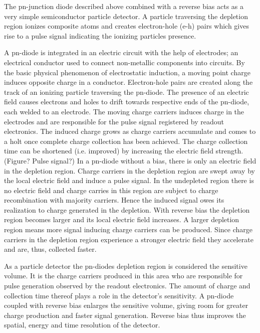 The pn-junction diode described above combined with a reverse bias acts as a very simple semiconductor particle detector. A particle traversing the depletion region ionizes composite atoms and creates electron-hole (e-h) pairs which gives rise to a pulse signal indicating the ionizing particles presence.

A pn-diode is integrated in an electric circuit with the help of electrodes; an electrical conductor used to connect non-metallic components into circuits. By the basic physical phenomenon of electrostatic induction, a moving point charge induces opposite charge in a conductor. Electron-hole pairs are created along the track of an ionizing particle traversing the pn-diode. The presence of an electric field causes electrons and holes to drift towards respective ends of the pn-diode, each welded to an electrode. The moving charge carriers induces charge in the electrodes and are responsible for the pulse signal registered by readout electronics. The induced charge grows as charge carriers accumulate and comes to a holt once complete charge collection has been achieved. The charge collection time can be shortened (i.e. improved) by increasing the electric field strength.  (Figure? Pulse signal?)
In a pn-diode without a bias, there is only an electric field in the depletion region. Charge carriers in the depletion region are swept away by the local electric field and induce a pulse signal. In the undepleted region there is no electric field and charge carries in this region are subject to charge recombination with majority carriers. Hence the induced signal owes its realization to charge generated in the depletion.
With reverse bias the depletion region becomes larger and its local electric field increases. A larger depletion region means more signal inducing charge carriers can be produced.  Since charge carriers in the depletion region experience a stronger electric field they accelerate and are, thus, collected faster.

As a particle detector the pn-diodes depletion region is considered the sensitive volume. It is the charge carriers produced in this area who are responsible for pulse generation observed by the readout electronics. The amount of charge and collection time thereof plays a role in the detector’s sensitivity. A pn-diode coupled with reverse bias enlarges the sensitive volume, giving room for greater charge production and faster signal generation. Reverse bias thus improves the spatial, energy and time resolution of the detector.
